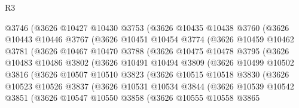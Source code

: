 \begin{lexlean}{R3}
\begin{coremodule}
              @3746
              (@3626
                @10427
                @10430
                @3753
                (@3626
                  @10435
                  @10438
                  @3760
                  (@3626
                    @10443
                    @10446
                    @3767
                    (@3626
                      @10451
                      @10454
                      @3774
                      (@3626
                        @10459
                        @10462
                        @3781
                        (@3626
                          @10467
                          @10470
                          @3788
                          (@3626
                            @10475
                            @10478
                            @3795
                            (@3626
                              @10483
                              @10486
                              @3802
                              (@3626
                                @10491
                                @10494
                                @3809
                                (@3626
                                  @10499
                                  @10502
                                  @3816
                                  (@3626
                                    @10507
                                    @10510
                                    @3823
                                    (@3626
                                      @10515
                                      @10518
                                      @3830
                                      (@3626
                                        @10523
                                        @10526
                                        @3837
                                        (@3626
                                          @10531
                                          @10534
                                          @3844
                                          (@3626
                                            @10539
                                            @10542
                                            @3851
                                            (@3626
                                              @10547
                                              @10550
                                              @3858
                                              (@3626
                                                @10555
                                                @10558
                                                @3865

\end{coremodule}
\end{lexlean}
